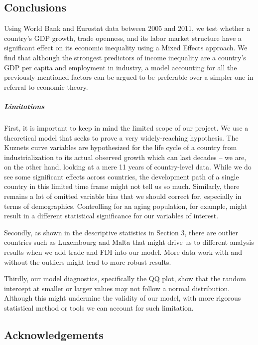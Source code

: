 \documentclass[
]{article}
\begin{document}
\hypertarget{conclusions}{%
\subsection{Conclusions}\label{conclusions}}

Using World Bank and Eurostat data between 2005 and 2011, we test
whether a country's GDP growth, trade openness, and its labor market
structure have a significant effect on its economic inequality using a
Mixed Effects approach. We find that although the strongest predictors
of income inequality are a country's GDP per capita and employment in
industry, a model accounting for all the previously-mentioned factors
can be argued to be preferable over a simpler one in referral to
economic theory.

\hypertarget{limitations}{%
\subparagraph{Limitations}\label{limitations}}

First, it is important to keep in mind the limited scope of our project.
We use a theoretical model that seeks to prove a very widely-reaching
hypothesis. The Kuznets curve variables are hypothesized for the life
cycle of a country from industrialization to its actual observed growth
which can last decades -- we are, on the other hand, looking at a mere
11 years of country-level data. While we do see some significant effects
across countries, the development path of a single country in this
limited time frame might not tell us so much. Similarly, there remains a
lot of omitted variable bias that we should correct for, especially in
terms of demographics. Controlling for an aging population, for example,
might result in a different statistical significance for our variables
of interest.

Secondly, as shown in the descriptive statistics in Section 3, there are
outlier countries such as Luxembourg and Malta that might drive us to
different analysis results when we add trade and FDI into our model.
More data work with and without the outliers might lead to more robust
results.

Thirdly, our model diagnostics, specifically the QQ plot, show that the
random intercept at smaller or larger values may not follow a normal
distribution. Although this might undermine the validity of our model,
with more rigorous statistical method or tools we can account for such
limitation.

\hypertarget{acknowledgements}{%
\subsection{Acknowledgements}\label{acknowledgements}}
\end{document}
